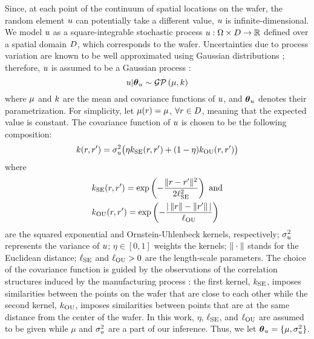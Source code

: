 Since, at each point of the continuum of spatial locations on the wafer, the random element $u$ can potentially take a different value, $u$ is infinite-dimensional. We model $u$ as a square-integrable stochastic process $u: \Omega \times D \to \mathbb{R}$ defined over a spatial domain $D$, which corresponds to the wafer. Uncertainties due to process variation are known to be well approximated using Gaussian distributions \cite{srivastava2010}; therefore, $u$ is assumed to be a Gaussian process \cite{rasmussen2006}:
\[
  \u | \vparam_\u \sim \gaussianp{\fMean}{\fCov}
\]
where $\fMean$ and $\fCov$ are the mean and covariance functions of $u$, and ${\boldsymbol\theta}_u$ denotes their parametrization. For simplicity, let $\fMean{\r} = \mu$, $\forall r \in D$, meaning that the expected value is constant. The covariance function of $u$ is chosen to be the following composition:
\begin{equation} \elabel{covariance-function}
  \fCov{\r, \r'} = \sigma_\u^2 \big( \eta \fCov_\SE(\r, \r') + (1 - \eta) \fCov_\OU(\r, \r') \big)
\end{equation}
where
\begin{align*}
  & \fCov_\SE(\r, \r') = \exp\left(-\frac{\norm{\r - \r'}^2}{2 \ell_\SE^2}\right) \text{ and} \\
  & \fCov_\OU(\r, \r') = \exp\left(- \frac{\abs{\,\norm{\r} - \norm{\r'}\,}}{\ell_\OU} \right)
\end{align*}
are the squared exponential and Ornstein-Uhlenbeck kernels, respectively; $\sigma_u^2$ represents the variance of $u$; $\eta \in [0, 1]$ weights the kernels; $\| \cdot \|$ stands for the Euclidean distance; $\ell_{\text{SE}}$ and $\ell_{\text{OU}} > 0$ are the length-scale parameters. The choice of the covariance function is guided by the observations of the correlation structures induced by the manufacturing process \cite{cheng2011}: the first kernel, $\fCov_\SE$, imposes similarities between the points on the wafer that are close to each other while the second kernel, $\fCov_\OU$, imposes similarities between points that are at the same distance from the center of the wafer. In this work, $\eta$, $\ell_{\text{SE}}$, and $\ell_{\text{OU}}$ are assumed to be given while $\mu$ and $\sigma^2_u$ are a part of our inference. Thus, we let ${\boldsymbol\theta}_u = \{ \mu, \sigma_u^2 \}$.

